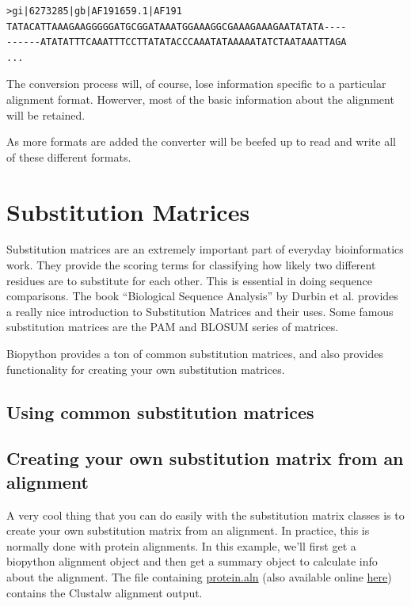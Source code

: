 \documentclass{report}
\begin{document}
\begin{verbatim}
>gi|6273285|gb|AF191659.1|AF191
TATACATTAAAGAAGGGGGATGCGGATAAATGGAAAGGCGAAAGAAAGAATATATA----
------ATATATTTCAAATTTCCTTATATACCCAAATATAAAAATATCTAATAAATTAGA
...
\end{verbatim}

The conversion process will, of course, lose information specific to a particular alignment format. Howerver, most of the basic information about the alignment will be retained.


As more formats are added the converter will be beefed up to read and write all of these different formats.

\section{Substitution Matrices}
\label{sec:sub_matrix}

Substitution matrices are an extremely important part of everyday bioinformatics work. They provide the scoring terms for classifying how likely two different residues are to substitute for each other. This is essential in doing sequence comparisons. The book ``Biological Sequence Analysis'' by Durbin et al. provides a really nice introduction to Substitution Matrices and their uses. Some famous substitution matrices are the PAM and BLOSUM series of matrices.


Biopython provides a ton of common substitution matrices, and also provides functionality for creating your own substitution matrices.

\subsection{Using common substitution matrices}

\subsection{Creating your own substitution matrix from an alignment}
\label{sec:subs_mat_ex}

A very cool thing that you can do easily with the substitution matrix
classes is to create your own substitution matrix from an
alignment. In practice, this is normally done with protein
alignments. In this example, we'll first get a biopython alignment
object and then get a summary object to calculate info about the
alignment. The file containing \href{examples/protein.aln}{protein.aln}
(also available online
\href{http://biopython.org/DIST/docs/tutorial/examples/protein.aln}{here})
contains the Clustalw alignment output.
\end{document}

